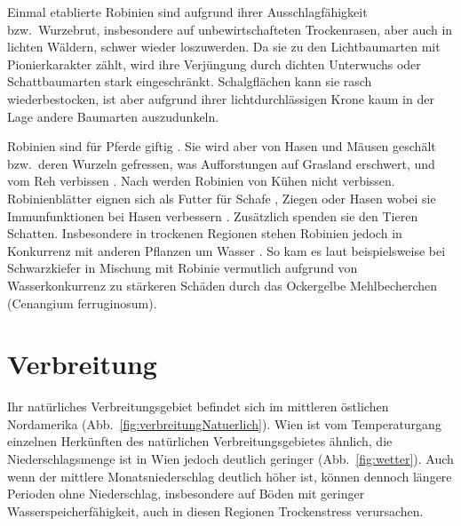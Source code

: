 \documentclass[twocolumn]{scrartcl}
\begin{document}
Einmal etablierte Robinien sind aufgrund ihrer Ausschlagfähigkeit
bzw.\ Wurzebrut, insbesondere auf unbewirtschafteten Trockenrasen, aber
auch in lichten Wäldern, schwer wieder loszuwerden. Da sie zu den
Lichtbaumarten mit Pionierkarakter zählt, wird ihre Verjüngung durch
dichten Unterwuchs oder Schattbaumarten stark
eingeschränkt. Schalgflächen kann sie rasch wiederbestocken, ist aber
aufgrund ihrer lichtdurchlässigen Krone kaum in der Lage andere
Baumarten auszudunkeln.

Robinien sind für Pferde giftig \citep{grosche2008robiniePferd}. Sie
wird aber von Hasen und Mäusen geschält bzw.\ deren Wurzeln gefressen,
was Aufforstungen auf Grasland erschwert, und vom Reh verbissen
\citep{barta2023robinieReh}. Nach \citet{berner2018robinie} werden
Robinien von Kühen nicht verbissen. Robinienblätter eignen sich als
Futter für Schafe \citep{ganai2009robnieSchaf}, Ziegen
\citep{papachristou1999robinieZiege} oder Hasen
\citep{singh2010robnieHasennahrung} wobei sie Immunfunktionen bei
Hasen verbessern \citep{yang2017robinieHasen}. Zusätzlich spenden sie
den Tieren Schatten. Insbesondere in trockenen Regionen stehen
Robinien jedoch in Konkurrenz mit anderen Pflanzen um Wasser
\citep{halasz2021robinieAlsTierutter}. So kam es laut
\citet[S.~96]{donaubauer1974kiefernsterben} beispielsweise bei
Schwarzkiefer in Mischung mit Robinie vermutlich aufgrund von
Wasserkonkurrenz zu stärkeren Schäden durch das Ockergelbe
Mehlbecherchen (Cenangium ferruginosum).

\section{Verbreitung}

Ihr natürliches Verbreitungsgebiet
befindet sich im mittleren östlichen Nordamerika
(Abb.~\ref{fig:verbreitungNatuerlich}). Wien ist vom Temperaturgang einzelnen
Herkünften des natürlichen Verbreitungsgebietes ähnlich, die Niederschlagsmenge
ist in Wien jedoch deutlich geringer (Abb.~\ref{fig:wetter}). Auch wenn der
mittlere Monatsniederschlag deutlich höher ist, können dennoch längere Perioden
ohne Niederschlag, insbesondere auf Böden mit geringer Wasserspeicherfähigkeit,
auch in diesen Regionen Trockenstress verursachen.
\end{document}
